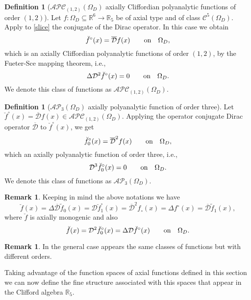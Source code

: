 \documentclass[reqno,11pt]{amsart}
\numberwithin{equation}{section}
\theoremstyle{definition}
\newtheorem{remark}[theorem]{{\bf Remark}}
\newtheorem{definition}[theorem]{Definition}
\begin{document}
\begin{definition}[$ \mathcal{APC}_{(1,2)}( \Omega_D)$ axially Cliffordian polyanalytic functions of order $(1,2)$]
Let $f: \Omega_D \subseteq \mathbb{R}^{6}\to \mathbb{R}_5$ be of axial type and of class $\mathcal{C}^5(\Omega_D)$.
Apply to \eqref{slice} the conjugate of the Dirac operator. In this case we obtain
\begin{equation}
	\label{polycliff}
	\breve{f}^{\circ}(x)=\mathcal{\overline{D}} f(x)  \qquad \hbox{on} \quad  \Omega_D,
\end{equation}
which is an axially Cliffordian polyanalytic functions of order $(1,2)$, by the Fueter-Sce mapping theorem, i.e.,
$$\Delta \mathcal{D}^2\breve{f}^{\circ}(x)=0\qquad \hbox{on} \quad  \Omega_D.$$
We denote this class of functions as $ \mathcal{APC}_{(1,2)}( \Omega_D)$.
\end{definition}

\begin{definition}[$\mathcal{AP}_3( \Omega_D)$ axially polyanalytic function of order three]
Let $\breve{f}^{\circ}(x)=\mathcal{\overline{D}} f(x)\in \mathcal{APC}_{(1,2)}( \Omega_D)$.
 Applying the operator conjugate Dirac operator $\mathcal{\overline{D}}$ to $\breve{f}^{\circ}(x)$, we get
$$\breve{f}^{\circ}_0(x)=\mathcal{\overline{D}}^2 f(x) \qquad \hbox{on} \quad  \Omega_D,$$
which an axially polyanalytic function of order three, i.e.,
$$
\mathcal{D}^3\breve{f}^{\circ}_0(x)=0 \qquad \hbox{on} \quad  \Omega_D.
$$
We denote this class of functions as $ \mathcal{AP}_3( \Omega_D)$.
\end{definition}
\begin{remark} Keeping in mind the above notations we have
$$ \breve{f}(x)=\Delta \mathcal{\overline{D}} \tilde{f}_0(x)=\mathcal{D}\breve{f}^{\circ}_1(x)= \mathcal{\overline{D}}^2f_{\circ}(x)=\Delta f^{\circ}(x)=\mathcal{\overline{D}} \tilde{f}_1(x),$$
where $\breve{f}$ is axially monogenic
and also
$$ \breve{f}(x)= \mathcal{D}^2 \breve{f}^{\circ}_0(x)= \Delta \mathcal{D} \breve{f}^{\circ}(x)\qquad \hbox{on} \quad  \Omega_D.$$
\end{remark}
\begin{remark}
In the general case appears the same classes of functions but with different orders.
\end{remark}
Taking advantage of the function spaces of axial functions defined in this section we can now
define the fine structure associated with this spaces that appear in the Clifford algebra $\mathbb R_5$.
\end{document}

